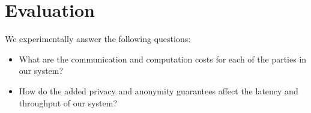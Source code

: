 \section{Evaluation}
\label{sec:evaluation}

We experimentally answer the following questions:
\begin{itemize}
  \item What are the communication and computation costs for each of the parties
    in our system?
  \item How do the added privacy and anonymity guarantees affect the latency and
    throughput of our system?
\end{itemize}
